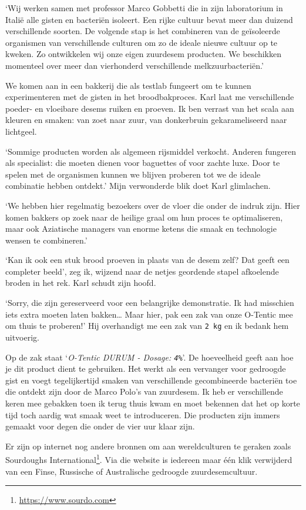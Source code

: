 \documentclass[
  11pt,
  dutch,
]{memoir}
\begin{document}
`Wij werken samen met professor Marco Gobbetti die in zijn laboratorium
in Italië alle gisten en bacteriën isoleert. Een rijke cultuur bevat
meer dan duizend verschillende soorten. De volgende stap is het
combineren van de geïsoleerde organismen van verschillende culturen om
zo de ideale nieuwe cultuur op te kweken. Zo ontwikkelen wij onze eigen
zuurdesem producten. We beschikken momenteel over meer dan vierhonderd
verschillende melkzuurbacteriën.'

We komen aan in een bakkerij die als testlab fungeert om te kunnen
experimenteren met de gisten in het broodbakproces. Karl laat me
verschillende poeder- en vloeibare desems ruiken en proeven. Ik ben
verrast van het scala aan kleuren en smaken: van zoet naar zuur, van
donkerbruin gekarameliseerd naar lichtgeel.

`Sommige producten worden als algemeen rijsmiddel verkocht. Anderen
fungeren als specialist: die moeten dienen voor baguettes of voor zachte
luxe. Door te spelen met de organismen kunnen we blijven proberen tot we
de ideale combinatie hebben ontdekt.' Mijn verwonderde blik doet Karl
glimlachen.

`We hebben hier regelmatig bezoekers over de vloer die onder de indruk
zijn. Hier komen bakkers op zoek naar de heilige graal om hun proces te
optimaliseren, maar ook Aziatische managers van enorme ketens die smaak
en technologie wensen te combineren.'

`Kan ik ook een stuk brood proeven in plaats van de desem zelf? Dat
geeft een completer beeld', zeg ik, wijzend naar de netjes geordende
stapel afkoelende broden in het rek. Karl schudt zijn hoofd.

`Sorry, die zijn gereserveerd voor een belangrijke demonstratie. Ik had
misschien iets extra moeten laten bakken\ldots{} Maar hier, pak een zak
van onze O-Tentic mee om thuis te proberen!' Hij overhandigt me een zak
van \texttt{2\ kg} en ik bedank hem uitvoerig.

Op de zak staat `\emph{O-Tentic DURUM - Dosage: \texttt{4\%}}'. De
hoeveelheid geeft aan hoe je dit product dient te gebruiken. Het werkt
als een vervanger voor gedroogde gist en voegt tegelijkertijd smaken van
verschillende gecombineerde bacteriën toe die ontdekt zijn door de Marco
Polo's van zuurdesem. Ik heb er verschillende keren mee gebakken toen ik
terug thuis kwam en moet bekennen dat het op korte tijd toch aardig wat
smaak weet te introduceren. Die producten zijn immers gemaakt voor degen
die onder de vier uur klaar zijn.

Er zijn op internet nog andere bronnen om aan wereldculturen te geraken
zoals Sourdoughs International\footnote{\url{https://www.sourdo.com}}.
Via die website is iedereen maar één klik verwijderd van een Finse,
Russische of Australische gedroogde zuurdesemcultuur.
\end{document}
